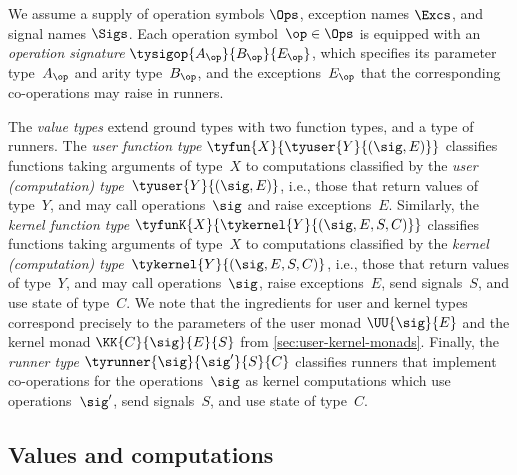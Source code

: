 We assume a supply of operation symbols $\Ops$, exception names $\Excs$, and
signal names $\Sigs$. Each operation symbol~$\op \in \Ops$ is equipped with an
\emph{operation signature} $\tysigop{A_\op}{B_\op}{E_\op}$, which specifies its
parameter type~$A_\op$ and arity type~$B_\op$, and the exceptions~$E_\op$ 
that the corresponding co-operations may raise in runners.

The \emph{value types} extend ground types with two 
function types, and a type of runners.
%
The \emph{user function type $\tyfun{X}{\tyuser{Y}{(\sig, E)}}$} classifies
functions taking arguments of type~$X$ to computations classified by the \emph{user
  (computation) type}~${\tyuser{Y}{(\sig, E)}}$, i.e., those that return values of
type~$Y$, and may call operations~$\sig$ and raise exceptions~$E$.
%
Similarly, the \emph{kernel function type
  $\tyfunK{X}{\tykernel{Y}{(\sig, E, S, C)}}$} classifies functions taking
arguments of type~$X$ to computations classified by the \emph{kernel
  (computation) type~$\tykernel{Y}{(\sig, E, S, C)}$}, i.e., those that return
values of type~$Y$, and may call operations~$\sig$, raise exceptions~$E$, send
signals~$S$, and use state of type~$C$. We note that the ingredients for user and kernel types
correspond precisely to the parameters of the user monad $\UU{\sig}{E}$ and the
kernel monad $\KK{C}{\sig}{E}{S}$ from \cref{sec:user-kernel-monads}.
%
Finally, the \emph{runner type $\tyrunner{\sig}{\sig'}{S}{C}$} classifies runners that
implement co-operations for the operations~$\sig$ as kernel computations which use 
operations~$\sig'$, send signals~$S$, and use state of type~$C$.


\subsection{Values and computations}
\label{sec:values-computations}



